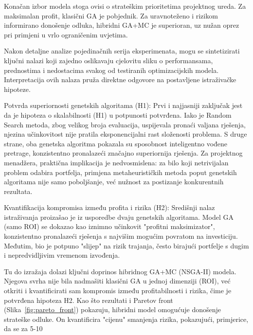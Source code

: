 Konačan izbor modela stoga ovisi o strateškim prioritetima projektnog ureda. Za maksimalan profit, klasični GA je pobjednik. Za uravnoteženo i rizikom informirano donošenje odluka, hibridni GA+MC je superioran, uz nužan oprez pri primjeni u vrlo ograničenim uvjetima.


Nakon detaljne analize pojedinačnih serija eksperimenata, mogu se sintetizirati ključni nalazi koji zajedno oslikavaju cjelovitu sliku o performansama, prednostima i nedostacima svakog od testiranih optimizacijskih modela. Interpretacija ovih nalaza pruža direktne odgovore na postavljene istraživačke hipoteze.

Potvrda superiornosti genetskih algoritama (H1):
Prvi i najjasniji zaključak jest da je hipoteza o skalabilnosti (H1) u potpunosti potvrđena. Iako je Random Search metoda, zbog velikog broja evaluacija, uspijevala pronaći valjana rješenja, njezina učinkovitost nije pratila eksponencijalni rast složenosti problema. S druge strane, oba genetska algoritma pokazala su sposobnost inteligentno vođene pretrage, konzistentno pronalazeći značajno superiornija rješenja. Za projektnog menadžera, praktična implikacija je nedvosmislena: za bilo koji netrivijalan problem odabira portfelja, primjena metaheurističkih metoda poput genetskih algoritama nije samo poboljšanje, već nužnost za postizanje konkurentnih rezultata.

Kvantifikacija kompromisa između profita i rizika (H2):
Središnji nalaz istraživanja proizašao je iz usporedbe dvaju genetskih algoritama. Model GA (samo ROI) se dokazao kao iznimno učinkovit "profitni maksimizator", konzistentno pronalazeći rješenja s najvišim mogućim povratom na investiciju. Međutim, bio je potpuno "slijep" na rizik trajanja, često birajući portfelje s dugim i nepredvidljivim vremenom izvođenja.

Tu do izražaja dolazi ključni doprinos hibridnog GA+MC (NSGA-II) modela. Njegova svrha nije bila nadmašiti klasični GA u jednoj dimenziji (ROI), već otkriti i kvantificirati sam kompromis između profitabilnosti i rizika, čime je potvrđena hipoteza H2. Kao što rezultati i Paretov front (Slika~\ref{fig:pareto_front}) pokazuju, hibridni model omogućuje donošenje strateške odluke. On kvantificira "cijenu" smanjenja rizika, pokazujući, primjerice, da se za 5-10%

